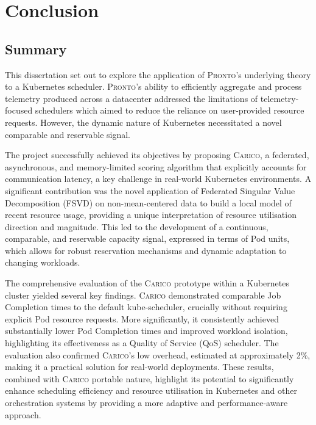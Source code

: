 \chapter{Conclusion}

%
%

\section{Summary}
This dissertation set out to explore the application of \textsc{Pronto}'s
underlying theory to a Kubernetes scheduler. \textsc{Pronto}'s ability to
efficiently aggregate and process telemetry produced across a datacenter
addressed the limitations of telemetry-focused schedulers which aimed to reduce
the reliance on user-provided resource requests. However, the dynamic nature of
Kubernetes necessitated a novel comparable and reservable signal.

The project successfully achieved its objectives by proposing \textsc{Carico}, a
federated, asynchronous, and memory-limited scoring algorithm that explicitly
accounts for communication latency, a key challenge in real-world Kubernetes
environments. A significant contribution was the novel application of Federated
Singular Value Decomposition (FSVD) on non-mean-centered data to build a local
model of recent resource usage, providing a unique interpretation of resource
utilisation direction and magnitude. This led to the development of a
continuous, comparable, and reservable capacity signal, expressed in terms of
Pod units, which allows for robust reservation mechanisms and dynamic adaptation
to changing workloads.

The comprehensive evaluation of the \textsc{Carico} prototype within a Kubernetes cluster
yielded several key findings. \textsc{Carico} demonstrated comparable Job
Completion times to the default kube-scheduler, crucially without requiring
explicit Pod resource requests. More significantly, it consistently achieved
substantially lower Pod Completion times and improved workload isolation,
highlighting its effectiveness as a Quality of Service (QoS) scheduler. The
evaluation also confirmed \textsc{Carico}'s low overhead, estimated at approximately 2\%,
making it a practical solution for real-world deployments. These results,
combined with \textsc{Carico} portable nature, highlight its potential to
significantly enhance scheduling efficiency and resource utilisation in
Kubernetes and other orchestration systems by providing a more adaptive and
performance-aware approach.


